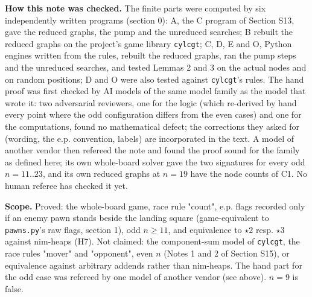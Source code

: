 \textbf{How this note was checked.} The finite parts were computed by six independently written programs (section 0): A, the C program of Section S13, gave the reduced graphs, the pump and the unreduced searches; B rebuilt the reduced graphs on the project's game library \texttt{cylcgt}; C, D, E and O, Python engines written from the rules, rebuilt the reduced graphs, ran the pump steps and the unreduced searches, and tested Lemmas 2 and 3 on the actual nodes and on random positions; D and O were also tested against \texttt{cylcgt}'s rules. The hand proof was first checked by AI models of the same model family as the model that wrote it: two adversarial reviewers, one for the logic (which re-derived by hand every point where the odd configuration differs from the even cases) and one for the computations, found no mathematical defect; the corrections they asked for (wording, the e.p. convention, labels) are incorporated in the text. A model of another vendor then refereed the note and found the proof sound for the family as defined here; its own whole-board solver gave the two signatures for every odd $n=11..23$, and its own reduced graphs at $n=19$ have the node counts of C1. No human referee has checked it yet.

\textbf{Scope.} Proved: the whole-board game, race rule "count", e.p. flags recorded only if an enemy pawn stands beside the landing square (game-equivalent to \texttt{pawns.py}'s raw flags, section 1), odd $n\ge11$, and equivalence to $\star2$ resp. $\star3$ against nim-heaps (H7). Not claimed: the component-sum model of \texttt{cylcgt}, the race rules "mover" and "opponent", even $n$ (Notes 1 and 2 of Section S15), or equivalence against arbitrary addends rather than nim-heaps. The hand part for the odd case was refereed by one model of another vendor (see above). $n=9$ is false.


